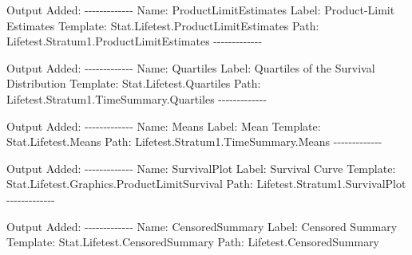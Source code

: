 \documentclass[
  12pt,
  letterpaper,
  DIV=11,
  numbers=noendperiod,
  onepage,
  openany]{scrreprt}
\newenvironment{Shaded}{\begin{snugshade}}{\end{snugshade}}
\newcommand{\NormalTok}[1]{\textcolor[rgb]{0.80,0.80,0.80}{#1}}
\newcommand{\SpecialCharTok}[1]{\textcolor[rgb]{0.86,0.64,0.64}{#1}}
\begin{document}
\begin{Shaded}
\begin{Highlighting}[]
\NormalTok{Output Added}\SpecialCharTok{:}
\SpecialCharTok{{-}{-}{-}{-}{-}{-}{-}{-}{-}{-}{-}{-}{-}}
\NormalTok{Name}\SpecialCharTok{:}\NormalTok{       ProductLimitEstimates}
\NormalTok{Label}\SpecialCharTok{:}\NormalTok{      Product}\SpecialCharTok{{-}}\NormalTok{Limit Estimates}
\NormalTok{Template}\SpecialCharTok{:}\NormalTok{   Stat.Lifetest.ProductLimitEstimates}
\NormalTok{Path}\SpecialCharTok{:}\NormalTok{       Lifetest.Stratum1.ProductLimitEstimates}
\SpecialCharTok{{-}{-}{-}{-}{-}{-}{-}{-}{-}{-}{-}{-}{-}}

\NormalTok{Output Added}\SpecialCharTok{:}
\SpecialCharTok{{-}{-}{-}{-}{-}{-}{-}{-}{-}{-}{-}{-}{-}}
\NormalTok{Name}\SpecialCharTok{:}\NormalTok{       Quartiles}
\NormalTok{Label}\SpecialCharTok{:}\NormalTok{      Quartiles of the Survival Distribution}
\NormalTok{Template}\SpecialCharTok{:}\NormalTok{   Stat.Lifetest.Quartiles}
\NormalTok{Path}\SpecialCharTok{:}\NormalTok{       Lifetest.Stratum1.TimeSummary.Quartiles}
\SpecialCharTok{{-}{-}{-}{-}{-}{-}{-}{-}{-}{-}{-}{-}{-}}

\NormalTok{Output Added}\SpecialCharTok{:}
\SpecialCharTok{{-}{-}{-}{-}{-}{-}{-}{-}{-}{-}{-}{-}{-}}
\NormalTok{Name}\SpecialCharTok{:}\NormalTok{       Means}
\NormalTok{Label}\SpecialCharTok{:}\NormalTok{      Mean}
\NormalTok{Template}\SpecialCharTok{:}\NormalTok{   Stat.Lifetest.Means}
\NormalTok{Path}\SpecialCharTok{:}\NormalTok{       Lifetest.Stratum1.TimeSummary.Means}
\SpecialCharTok{{-}{-}{-}{-}{-}{-}{-}{-}{-}{-}{-}{-}{-}}

\NormalTok{Output Added}\SpecialCharTok{:}
\SpecialCharTok{{-}{-}{-}{-}{-}{-}{-}{-}{-}{-}{-}{-}{-}}
\NormalTok{Name}\SpecialCharTok{:}\NormalTok{       SurvivalPlot}
\NormalTok{Label}\SpecialCharTok{:}\NormalTok{      Survival Curve}
\NormalTok{Template}\SpecialCharTok{:}\NormalTok{   Stat.Lifetest.Graphics.ProductLimitSurvival}
\NormalTok{Path}\SpecialCharTok{:}\NormalTok{       Lifetest.Stratum1.SurvivalPlot}
\SpecialCharTok{{-}{-}{-}{-}{-}{-}{-}{-}{-}{-}{-}{-}{-}}

\NormalTok{Output Added}\SpecialCharTok{:}
\SpecialCharTok{{-}{-}{-}{-}{-}{-}{-}{-}{-}{-}{-}{-}{-}}
\NormalTok{Name}\SpecialCharTok{:}\NormalTok{       CensoredSummary}
\NormalTok{Label}\SpecialCharTok{:}\NormalTok{      Censored Summary}
\NormalTok{Template}\SpecialCharTok{:}\NormalTok{   Stat.Lifetest.CensoredSummary}
\NormalTok{Path}\SpecialCharTok{:}\NormalTok{       Lifetest.CensoredSummary}
\end{Highlighting}
\end{Shaded}
\end{document}
